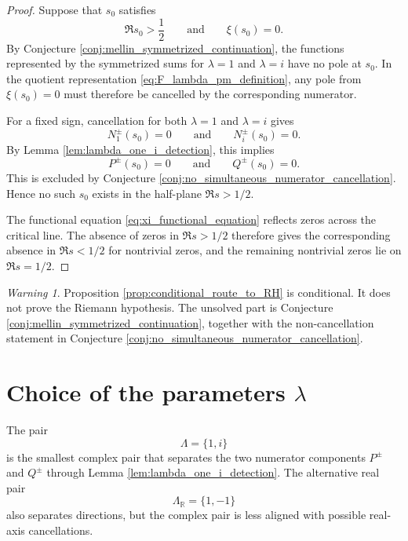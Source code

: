 \documentclass[11pt]{amsart}
\numberwithin{equation}{section}
\theoremstyle{plain}
\theoremstyle{definition}
\theoremstyle{remark}
\newtheorem{warning}[theorem]{Warning}
\begin{document}
\begin{proof}
Suppose that \(s_0\) satisfies
\begin{equation}
\Re s_0>\frac12
\qquad\text{and}\qquad
\xi(s_0)=0.
\label{eq:assume_off_line_zero}
\end{equation}
By Conjecture \ref{conj:mellin_symmetrized_continuation}, the functions represented by the symmetrized sums for \(\lambda=1\) and \(\lambda=i\) have no pole at \(s_0\).  In the quotient representation \eqref{eq:F_lambda_pm_definition}, any pole from \(\xi(s_0)=0\) must therefore be cancelled by the corresponding numerator.

For a fixed sign, cancellation for both \(\lambda=1\) and \(\lambda=i\) gives
\begin{equation}
N_1^{\pm}(s_0)=0
\qquad\text{and}\qquad
N_i^{\pm}(s_0)=0.
\label{eq:cancellation_for_two_lambdas_at_s0}
\end{equation}
By Lemma \ref{lem:lambda_one_i_detection}, this implies
\begin{equation}
P^{\pm}(s_0)=0
\qquad\text{and}\qquad
Q^{\pm}(s_0)=0.
\label{eq:PQ_zero_at_s0_after_cancellation}
\end{equation}
This is excluded by Conjecture \ref{conj:no_simultaneous_numerator_cancellation}.  Hence no such \(s_0\) exists in the half-plane \(\Re s>1/2\).

The functional equation \eqref{eq:xi_functional_equation} reflects zeros across the critical line.  The absence of zeros in \(\Re s>1/2\) therefore gives the corresponding absence in \(\Re s<1/2\) for nontrivial zeros, and the remaining nontrivial zeros lie on \(\Re s=1/2\).
\end{proof}

\begin{warning}
\label{warn:no_RH_proof_claimed}
Proposition \ref{prop:conditional_route_to_RH} is conditional.  It does not prove the Riemann hypothesis.  The unsolved part is Conjecture \ref{conj:mellin_symmetrized_continuation}, together with the non-cancellation statement in Conjecture \ref{conj:no_simultaneous_numerator_cancellation}.
\end{warning}

\section{Choice of the parameters \texorpdfstring{$\lambda$}{lambda}}
\label{sec:lambda_choice}

The pair
\begin{equation}
\Lambda=\{1,i\}
\label{eq:lambda_pair_one_i}
\end{equation}
is the smallest complex pair that separates the two numerator components \(P^\pm\) and \(Q^\pm\) through Lemma \ref{lem:lambda_one_i_detection}.  The alternative real pair
\begin{equation}
\Lambda_{\mathbb R}=\{1,-1\}
\label{eq:lambda_pair_real}
\end{equation}
also separates directions, but the complex pair is less aligned with possible real-axis cancellations.
\end{document}
